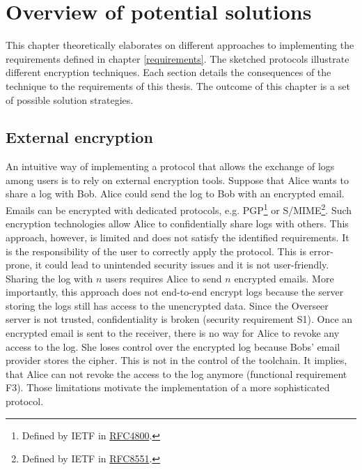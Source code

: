 \documentclass[../main.tex]{subfiles}
\begin{document}
\chapter{Overview of potential solutions}

This chapter theoretically elaborates on different approaches to implementing the requirements defined in chapter \ref{requirements}.
The sketched protocols illustrate different encryption techniques.
Each section details the consequences of the technique to the requirements of this thesis.
The outcome of this chapter is a set of possible solution strategies.

\section{External encryption}
\label{sec:external-encryption}
An intuitive way of implementing a protocol that allows the exchange of logs among users is to rely on external encryption tools.
Suppose that Alice wants to share a log with Bob.
Alice could send the log to Bob with an encrypted email.
Emails can be encrypted with dedicated protocols, e.g. PGP\footnote{Defined by IETF in \href{https://www.rfc-editor.org/rfc/rfc4880}{RFC4800}.} or S/MIME\footnote{Defined by IETF in \href{https://www.rfc-editor.org/rfc/rfc8551.html}{RFC8551}.}.
Such encryption technologies allow Alice to confidentially share logs with others.
This approach, however, is limited and does not satisfy the identified requirements.
It is the responsibility of the user to correctly apply the protocol.
This is error-prone, it could lead to unintended security issues and it is not user-friendly.
Sharing the log with $n$ users requires Alice to send $n$ encrypted emails.
More importantly, this approach does not end-to-end encrypt logs because the server storing the logs still has access to the unencrypted data.
Since the Overseer server is not trusted, confidentiality is broken (security requirement S1).
Once an encrypted email is sent to the receiver, there is no way for Alice to revoke any access to the log.
She loses control over the encrypted log because Bobs' email provider stores the cipher.
This is not in the control of the toolchain.
It implies, that Alice can not revoke the access to the log anymore (functional requirement F3).
Those limitations motivate the implementation of a more sophisticated protocol.
\end{document}

